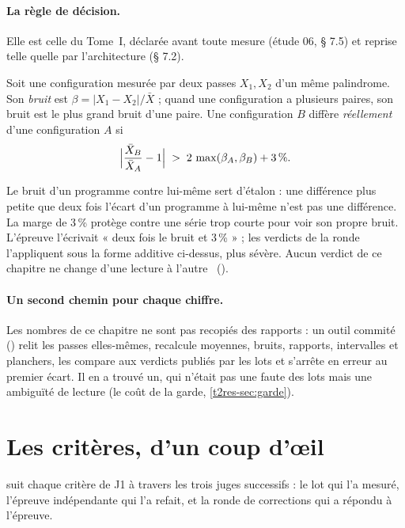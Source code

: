 \paragraph{La règle de décision.} Elle est celle du Tome~I, déclarée avant toute mesure (étude 06, § 7.5) et reprise telle quelle par l'architecture (§ 7.2).

\begin{definition}\label{t2res-def:reel}
Soit une configuration mesurée par deux passes $X_1, X_2$ d'un même palindrome. Son \emph{bruit} est $\beta = |X_1 - X_2| / \bar X$ ; quand une configuration a plusieurs paires, son bruit est le plus grand bruit d'une paire. Une configuration $B$ diffère \emph{réellement} d'une configuration $A$ si
\[
\Bigl|\frac{\bar X_B}{\bar X_A} - 1\Bigr| \;>\; 2\,\max(\beta_A, \beta_B) + 3\,\%.
\]
\end{definition}

Le bruit d'un programme contre lui-même sert d'étalon : une différence plus petite que deux fois l'écart d'un programme à lui-même n'est pas une différence. La marge de 3\,\% protège contre une série trop courte pour voir son propre bruit. L'épreuve l'écrivait « deux fois le bruit et 3\,\% » ; les verdicts de la ronde l'appliquent sous la forme additive ci-dessus, plus sévère. Aucun verdict de ce chapitre ne change d'une lecture à l'autre \calc~().

\paragraph{Un second chemin pour chaque chiffre.} Les nombres de ce chapitre ne sont pas recopiés des rapports : un outil commité () relit les passes elles-mêmes, recalcule moyennes, bruits, rapports, intervalles et planchers, les compare aux verdicts publiés par les lots et s'arrête en erreur au premier écart. Il en a trouvé un, qui n'était pas une faute des lots mais une ambiguïté de lecture (le coût de la garde, \cref{t2res-sec:garde}).

\section{Les critères, d'un coup d'œil}\label{t2res-sec:criteres}

 suit chaque critère de J1 à travers les trois juges successifs : le lot qui l'a mesuré, l'épreuve indépendante qui l'a refait, et la ronde de corrections qui a répondu à l'épreuve.


